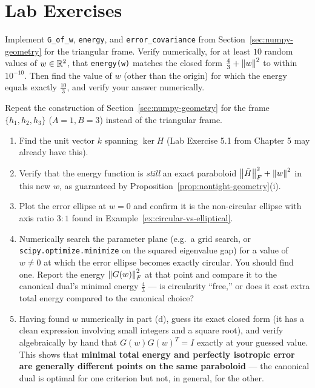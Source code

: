 \section{Lab Exercises}
\label{sec:lab-ch6}

\begin{exercisebox}[title={Lab Exercise 6.1: Reproducing the Paraboloid}]
Implement \texttt{G\_of\_w}, \texttt{energy}, and
\texttt{error\_covariance} from Section~\ref{sec:numpy-geometry} for the
triangular frame. Verify numerically, for at least $10$ random values of
$w\in\mathbb{R}^2$, that \texttt{energy(w)} matches the closed form
$\tfrac43+\left\| w \right\|^2$ to within $10^{-10}$. Then find the value of $w$
(other than the origin) for which the energy equals exactly $\tfrac{10}{3}$,
and verify your answer numerically.
\end{exercisebox}

\begin{exercisebox}[title={Lab Exercise 6.2: The Non-Tight Case}]
Repeat the construction of Section~\ref{sec:numpy-geometry} for the
frame $\{h_1,h_2,h_3\}$ ($A=1,B=3$) instead of the triangular frame.
\begin{enumerate}[label=(\alph*)]
  \item Find the unit vector $k$ spanning $\ker H$ (Lab Exercise 5.1
        from Chapter 5 may already have this).
  \item Verify that the energy function is \emph{still} an exact
        paraboloid $\left\| \tilde H \right\|_F^2+\left\| w \right\|^2$ in this new $w$, as
        guaranteed by Proposition~\ref{prop:nontight-geometry}(i).
  \item Plot the error ellipse at $w=0$ and confirm it is the
        non-circular ellipse with axis ratio $3:1$ found in
        Example~\ref{ex:circular-vs-elliptical}.
  \item Numerically search the parameter plane (e.g.\ a grid search, or
        \texttt{scipy.optimize.minimize} on the squared eigenvalue gap)
        for a value of $w\ne0$ at which the error ellipse becomes
        exactly circular. You should find one. Report the energy
        $\left\| G(w) \right\|_F^2$ at that point and compare it to the canonical
        dual's minimal energy $\tfrac43$ --- is circularity ``free,'' or
        does it cost extra total energy compared to the canonical
        choice?
  \item Having found $w$ numerically in part (d), guess its exact
        closed form (it has a clean expression involving small
        integers and a square root), and verify algebraically by hand
        that $G(w)G(w)^T=I$ exactly at your guessed value. This shows
        that \textbf{minimal total energy and perfectly isotropic error
        are generally different points on the same paraboloid} ---
        the canonical dual is optimal for one criterion but not, in
        general, for the other.
\end{enumerate}
\end{exercisebox}

